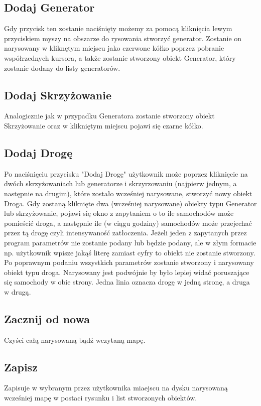 \documentclass{article}
\begin{document}
\subsection{Dodaj Generator}
    Gdy przycisk ten zostanie naciśnięty możemy za pomocą kliknięcia lewym przyciskiem myszy na obszarze do rysowania stworzyć generator. Zostanie on narysowany w kliknętym miejscu jako czerwone kółko poprzez pobranie współrzednych kursora, a także zostanie stworzony obiekt Generator, który zostanie dodany do listy generatorów.

\subsection{Dodaj Skrzyżowanie}
    Analogicznie jak w przypadku Generatora zostanie stworzony obiekt Skrzyżowanie oraz w klikniętym miejscu pojawi się czarne kółko.

\subsection{Dodaj Drogę}
    Po naciśnięciu przycisku "Dodaj Drogę" użytkownik może poprzez kliknięcie na dwóch skrzyżowaniach lub generatorze i skrzyrzowaniu (najpierw jednym, a następnie na drugim), które zostało wcześniej narysowane, stworzyć nowy obiekt Droga. Gdy zostaną kliknięte dwa (wcześniej narysowane) obiekty typu Generator lub skrzyżowanie, pojawi się okno z zapytaniem o to ile samochodów może pomieścić droga, a następnie ile (w ciągu godziny) samochodów może przejechać przez tą drogę czyli intensywaność zatłoczenia. Jeżeli jeden z zapytanych przez program parametrów nie zostanie podany lub będzie podany, ale w złym formacie np. użytkownik wpisze jakąś literę zamiast cyfry to obiekt nie zostanie stworzony. Po poprawnym podaniu wszystkich parametrów zostanie stworzony i narysowany obiekt typu droga. Narysowany jest podwójnie by było lepiej widać poruszające się samochody w obie strony. Jedna linia oznacza drogę w jedną stronę, a druga w drugą.

\subsection{Zacznij od nowa}
    Czyści całą narysowaną bądź wczytaną mapę.

\subsection{Zapisz}
    Zapisuje w wybranym przez użytkownika miaejscu na dysku narysowaną wcześniej mapę w postaci rysunku i list stworzonych obiektów.
\end{document}
